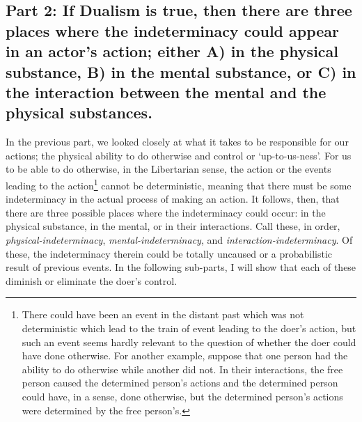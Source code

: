 \subsection{Part 2: If Dualism is true, then there are three places where the indeterminacy could appear in an actor’s action; either A) in the physical substance, B) in the mental substance, or C) in the interaction between the mental and the physical substances.}
In the previous part, we looked closely at what it takes to be responsible for our actions; the physical ability to do otherwise and control or ‘up-to-us-ness’. For us to be able to do otherwise, in the Libertarian sense, the action or the events leading to the action\footnote{There could have been an event in the distant past which was not deterministic which lead to the train of event leading to the doer’s action, but such an event seems hardly relevant to the question of whether the doer could have done otherwise. For another example, suppose that one person had the ability to do otherwise while another did not. In their interactions, the free person caused the determined person’s actions and the determined person could have, in a sense, done otherwise, but the determined person’s actions were determined by the free person’s.}  cannot be deterministic, meaning that there must be some indeterminacy in the actual process of making an action. It follows, then, that there are three possible places where the indeterminacy could occur: in the physical substance, in the mental, or in their interactions. Call these, in order, \emph{physical-indeterminacy}, \emph{mental-indeterminacy}, and \emph{interaction-indeterminacy}. Of these, the indeterminacy therein could be totally uncaused or a probabilistic result of previous events. In the following sub-parts, I will show that each of these diminish or eliminate the doer’s control. 

